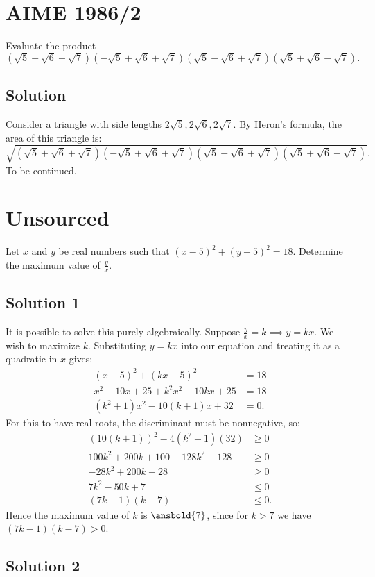 \documentclass{article}
\begin{document}
\pagebreak\section{AIME 1986/2}
Evaluate the product $(\sqrt 5+\sqrt6+\sqrt7)(-\sqrt 5+\sqrt6+\sqrt7)(\sqrt 5-\sqrt6+\sqrt7)(\sqrt 5+\sqrt6-\sqrt7).$

\subsection{Solution}
Consider a triangle with side lengths $2\sqrt{5},2\sqrt{6},2\sqrt{7}$. By Heron's formula, the area of this triangle is:
$$\sqrt{(\sqrt 5+\sqrt6+\sqrt7)(-\sqrt 5+\sqrt6+\sqrt7)(\sqrt 5-\sqrt6+\sqrt7)(\sqrt 5+\sqrt6-\sqrt7)}.$$
To be continued.

\pagebreak\section{Unsourced}
Let $x$ and $y$ be real numbers such that $(x - 5)^2 + (y - 5)^2 = 18.$ Determine the maximum value of $\frac{y}{x}.$

\subsection{Solution 1}
It is possible to solve this purely algebraically.
Suppose $\frac{y}{x}=k \implies y=kx$. We wish to maximize $k$. Substituting $y=kx$ into our equation and treating it as a quadratic in $x$ gives:
\begin{align*}
    (x-5)^2+(kx-5)^2&=18\\
    x^2-10x+25+k^2x^2-10kx+25&=18\\
    (k^2+1)x^2-10(k+1)x+32&=0.
\end{align*}
For this to have real roots, the discriminant must be nonnegative, so:
\begin{align*}
    (10(k+1))^2-4(k^2+1)(32)&\geq 0\\
    100k^2+200k+100-128k^2-128&\geq 0\\
    -28k^2+200k-28&\geq 0\\
    7k^2-50k+7&\leq 0\\
    (7k-1)(k-7)&\leq 0.
\end{align*}
Hence the maximum value of $k$ is $\ansbold{7}$, since for $k>7$ we have $(7k-1)(k-7)>0$.

\subsection{Solution 2}
\end{document}
